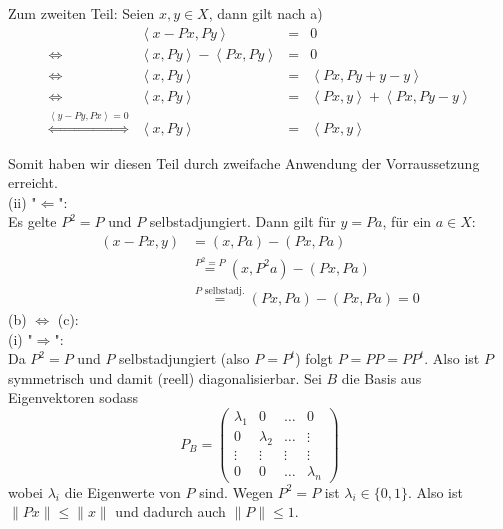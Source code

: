 \documentclass[11pt,a4paper,ngerman]{article}
\begin{document}
Zum zweiten Teil:
Seien $x, y \in X$, dann gilt nach a)
\begin{equation*}\begin{array}{crcl}
& \left\langle x - Px, Py \right\rangle &=& 0\\
\Leftrightarrow &
\left\langle x , Py \right\rangle - \left\langle Px, Py \right\rangle &=& 0\\
\Leftrightarrow &
\left\langle x, Py \right\rangle &=& \left\langle Px, Py + y - y \right\rangle\\
\Leftrightarrow &
\left\langle x , Py \right\rangle &=&
\left\langle Px, y \right\rangle + \left\langle Px, Py - y \right\rangle\\
\stackrel{\left\langle y - Py, Px \right\rangle = 0}{\Leftrightarrow}&
\left\langle x , Py \right\rangle &=& \left\langle Px , y \right\rangle
\end{array}\end{equation*}

Somit haben wir diesen Teil durch zweifache Anwendung der Vorraussetzung erreicht. \\
(ii) "$\Leftarrow$": \\
Es gelte $P^2 = P$ und $P$ selbstadjungiert. Dann gilt für $y = Pa$, für ein $a \in X$:
\begin{equation*}\begin{split}
(x-Px,y) &= (x,Pa) - (Px,Pa) \\
      &\stackrel{P^2 = P}{=} (x,P^2 a) - (Px,Pa) \\
      &\stackrel{P \text{ selbstadj.}}{=} (Px, Pa) - (Px,Pa) = 0
\end{split}\end{equation*}
(b) $\Leftrightarrow$ (c): \\
(i) "$\Rightarrow$": \\
Da $P^2 = P$ und $P$ selbstadjungiert (also $P = P^t$) folgt $P = PP = P P^t$. Also ist $P$ symmetrisch und damit (reell) diagonalisierbar. Sei $B$ die Basis aus Eigenvektoren sodass
\begin{equation*}
 P_B = \left(\begin{array}{cccc}
      \lambda_1 & 0 & \hdots & 0\\
      0 & \lambda_2 & \hdots & \vdots \\
      \vdots & \vdots & \vdots & \vdots \\
      0 & 0 & \hdots & \lambda_n
      \end{array} \right)
\end{equation*}
wobei $\lambda_i$ die Eigenwerte von $P$ sind.
Wegen $P^2 = P$ ist $\lambda_i \in \{0,1 \}$. Also ist
$\| Px \| \leq \|x\|$ und dadurch auch $\|P \| \leq 1$.
\end{document}

